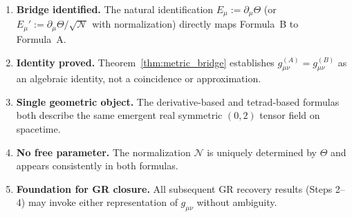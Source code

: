 \documentclass[12pt]{article}
\theoremstyle{definition}
\theoremstyle{remark}
\begin{document}
\begin{enumerate}
  \item \textbf{Bridge identified.}
        The natural identification $E_\mu := \partial_\mu\Theta$ (or
        $E_\mu' := \partial_\mu\Theta/\sqrt{\mathcal{N}}$ with normalization)
        directly maps Formula~B to Formula~A.
  \item \textbf{Identity proved.}
        Theorem~\ref{thm:metric_bridge} establishes $g_{\mu\nu}^{(A)} = g_{\mu\nu}^{(B)}$
        as an algebraic identity, not a coincidence or approximation.
  \item \textbf{Single geometric object.}
        The derivative-based and tetrad-based formulas both describe the same emergent
        real symmetric $(0,2)$ tensor field on spacetime.
  \item \textbf{No free parameter.}
        The normalization $\mathcal{N}$ is uniquely determined by $\Theta$ and appears
        consistently in both formulas.
  \item \textbf{Foundation for GR closure.}
        All subsequent GR recovery results (Steps 2--4) may invoke either representation
        of $g_{\mu\nu}$ without ambiguity.
\end{enumerate}

\ifdefined\INCLUDEMODE
\else
  
\end{document}
